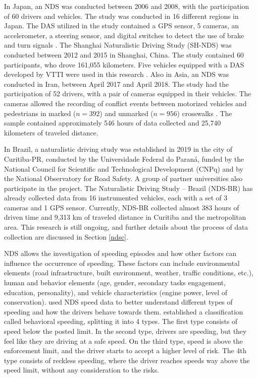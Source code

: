In Japan, an NDS was conducted between 2006 and 2008, with the participation of 60 drivers and vehicles. The study was conducted in 16 different regions in Japan. The DAS utilized in the study contained a GPS sensor, 5 cameras, an accelerometer, a steering sensor, and digital switches to detect the use of brake and turn signals \cite{Uchida2010}. The Shanghai Naturalistic Driving Study (SH-NDS) was conducted between 2012 and 2015 in Shanghai, China. The study contained 60 participants, who drove 161,055 kilometers. Five vehicles equipped with a DAS developed by VTTI were used in this research \cite{Zhu2018}. Also in Asia, an NDS was conducted in Iran, between April 2017 and April 2018. The study had the participation of 52 drivers, with a pair of cameras equipped in their vehicles. The cameras allowed the recording of conflict events between motorized vehicles and pedestrians in marked ($n = 392$) and unmarked ($n = 956$) crosswalks \cite{Sheykhfard2021}. The sample contained approximately 546 hours of data collected and 25,740 kilometers of traveled distance.

In Brazil, a naturalistic driving study was established in 2019 in the city of Curitiba-PR, conducted by the Universidade Federal do Paraná, funded by the National Council for Scientific and Technological Development (CNPq) and by the National Observatory for Road Safety. A group of partner universities also participate in the project. The Naturalistic Driving Study – Brazil (NDS-BR) has already collected data from 16 instrumented vehicles, each with a set of 3 cameras and 1 GPS sensor. Currently, NDS-BR collected almost 383 hours of driven time and 9,313 km of traveled distance in Curitiba and the metropolitan area. This research is still ongoing, and further details about the process of data collection are discussed in Section \ref{ndsc}.

NDS allows the investigation of speeding episodes and how other factors can influence the occurrence of speeding. These factors can include environmental elements (road infrastructure, built environment, weather, traffic conditions, etc.), human and behavior elements (age, gender, secondary tasks engagement, education, personality),  and vehicle characteristics (engine power, level of conservation). \textcite{Richard2013,Richard2017, Richard2020} used NDS speed data to better understand different types of speeding and how the drivers behave towards them. \textcite{Richard2013} established a classification called behavioral speeding, splitting it into 4 types. The first type consists of speed below the posted limit. In the second type, drivers are speeding, but they feel like they are driving at a safe speed. On the third type, speed is above the enforcement limit, and the driver starts to accept a higher level of risk. The 4th type consists of reckless speeding, where the driver reaches speeds way above the speed limit, without any consideration to the risks. 


